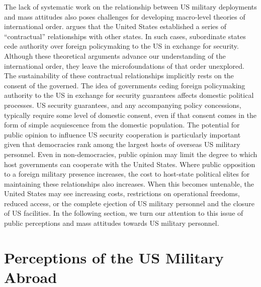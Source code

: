 The lack of systematic work on the relationship between US military deployments and mass attitudes also poses challenges for developing macro-level theories of international order.  argues that the United States established a series of ``contractual'' relationships with other states. In such cases, subordinate states cede authority over foreign policymaking to the US in exchange for security. Although these theoretical arguments advance our understanding of the international order, they leave the microfoundations of that order unexplored. The sustainability of these contractual relationships implicitly rests on the consent of the governed. The idea of governments ceding foreign policymaking authority to the US in exchange for security guarantees affects domestic political processes. US security guarantees, and any accompanying policy concessions, typically require some level of domestic consent, even if that consent comes in the form of simple acquiescence from the domestic population. The potential for public opinion to influence US security cooperation is particularly important given that democracies rank among the largest hosts of overseas US military personnel. Even in non-democracies, public opinion may limit the degree to which host governments can cooperate with the United States. Where public opposition to a foreign military presence increases, the cost to host-state political elites for maintaining these relationships also increases. When this becomes untenable, the United States may see increasing costs, restrictions on operational freedoms, reduced access, or the complete ejection of US military personnel and the closure of US facilities. In the following section, we turn our attention to this issue of public perceptions and mass attitudes towards US military personnel.







\section*{Perceptions of the US Military Abroad}


